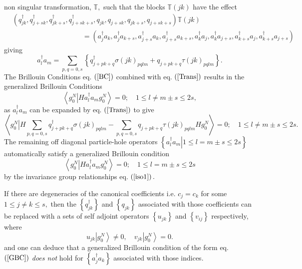 \documentclass[aps,preprint]{revtex4}%
\begin{document}
non singular transformation, $\mathbb{T},$ such that the blocks $\mathbb{T}%
\left(  jk\right)  $ have the effect
\begin{align}
&  \left(  q_{jk}^{\dagger},q_{j+sk}^{\dagger},q_{jk+s}^{\dagger}%
,q_{j+sk+s}^{\dagger},q_{jk},q_{j+sk},q_{jk+s},q_{j+sk+s}\right)
\mathbb{T}\left(  jk\right) \nonumber\\
&  \qquad\qquad\qquad\qquad\qquad\left.  =\right.  \left(  a_{j}^{\dagger
}a_{k},a_{j}^{\dagger}a_{k+s},a_{j+s}^{\dagger}a_{k},a_{j+s}^{\dagger}%
a_{k+s},a_{k}^{\dagger}a_{j},a_{k}^{\dagger}a_{j+s},a_{k+s}^{\dagger}%
a_{j},a_{k+s}^{\dagger}a_{j+s}\right)
\end{align}
giving
\begin{equation}
a_{l}^{\dagger}a_{m}=\sum_{p,q=0,s}\left\{  q_{j+pk+q}^{\dagger}\sigma\left(
jk\right)  _{pqlm}+q_{j+pk+q}\tau\left(  jk\right)  _{pqlm}\right\}  .
\label{Trans}%
\end{equation}
The Brillouin Conditions eq. $\left(  \ref{BC}\right)  $ combined with eq.
$\left(  \ref{Trans}\right)  $ results in the generalized Brillouin
Conditions
\begin{equation}
\left\langle \left.  g_{0}^{N}\right\vert Ha_{l}^{\dagger}a_{m}g_{0}%
^{N}\right\rangle =0;\quad1\leq l\neq m\pm s\leq2s, \label{GBC}%
\end{equation}
as $a_{l}^{\dagger}a_{m}$ can be expanded by eq. $\left(  \ref{Trans}\right)
$ to give%
\begin{equation}
\left\langle \left.  g_{0}^{N}\right\vert H\sum_{p,q=0,s}q_{j+pk+q}^{\dagger
}\sigma\left(  jk\right)  _{pqlm}-\sum_{p,q=0,s}q_{j+pk+q}\tau\left(
jk\right)  _{pqlm}Hg_{0}^{N}\right\rangle =0;\quad1\leq l\neq m\pm s\leq2s.
\end{equation}
The remaining off diagonal particle-hole operators $\left\{  \left.
a_{l}^{\dagger}a_{m}\right\vert 1\leq l=m\pm s\leq2s\right\}  $ automatically
satisfy a generalized Brillouin condition
\begin{equation}
\left\langle \left.  g_{0}^{N}\right\vert Ha_{l}^{\dagger}a_{m}g_{0}%
^{N}\right\rangle =0;\quad1\leq l=m\pm s\leq2s
\end{equation}
by the invariance group relationships eq. $\left(  \ref{iso1}\right)  .$

If there are degeneracies of the canonical coefficients i.e. $c_{j}=c_{k}$ for
some $1\leq j\neq k\leq s,$ then the $\left\{  q_{jk}^{\dagger}\right\}  $ and
$\left\{  q_{jk}\right\}  $ associated with those coefficients can be replaced
\cite{Goscinski82a} with a sets of self adjoint operators $\left\{
u_{jk}\right\}  $ and $\left\{  v_{ij}\right\}  $ respectively, where
\begin{equation}
u_{jk}\left\vert g_{0}^{N}\right\rangle \neq0,\quad v_{jk}\left\vert g_{0}%
^{N}\right\rangle =0.
\end{equation}
and one can deduce that a generalized Brillouin condition of the form eq.
$\left(  \ref{GBC}\right)  $ \emph{does not} hold for $\left\{  a_{j}%
^{\dagger}a_{k}\right\}  $ associated with those indices.
\end{document}
